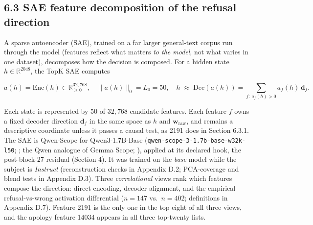 \subsection{6.3 SAE feature decomposition of the refusal
direction}\label{sae-feature-decomposition-of-the-refusal-direction}

A sparse autoencoder (SAE), trained on a far larger general-text corpus run through the model (features reflect what matters \emph{to the model}, not what varies in one dataset), decomposes how the decision is composed. For a
hidden state \(h \in \mathbb{R}^{2048}\), the TopK SAE \citep{gao2025scaling} computes

\[a(h) = \mathrm{Enc}(h) \in \mathbb{R}^{32{,}768}_{\ge 0},
  \quad \|a(h)\|_0 = L_0 = 50,
  \quad
  h \;\approx\; \mathrm{Dec}(a(h)) = \sum_{f :\, a_f(h) > 0} a_f(h)\, \mathbf{d}_f.\]

Each state is represented by \(50\) of \(32{,}768\) candidate features. Each feature \(f\) owns a fixed decoder direction \(\mathbf{d}_f\) in
the same space as \(h\) and \(\mathbf{w}_{\mathrm{raw}}\), and remains a
descriptive coordinate unless it passes a causal test, as 2191 does in
Section 6.3.1. The SAE is Qwen-Scope for Qwen3-1.7B-Base
(\texttt{qwen-scope-3-1.7b-base-w32k-l50}; \citealp{qwen2025qwenscope}; the Qwen
analogue of Gemma Scope; \citealp{lieberum2024gemmascope}), applied at its declared hook, the post-block-27 residual (Section 4). It was trained on the \emph{base} model while the subject is \emph{Instruct} (reconstruction checks in Appendix D.2; PCA-coverage and blend tests in Appendix D.3). Three \emph{correlational} views rank which features compose the direction: direct encoding, decoder alignment, and the empirical refusal-vs-wrong activation differential (\(n=147\) vs.~\(n=402\); definitions in Appendix D.7). Feature 2191 is the only one in the top eight of all three views, and the apology feature 14034 appears in all
three top-twenty lists.

